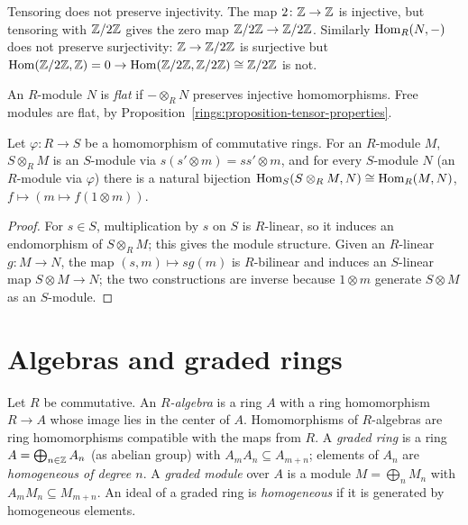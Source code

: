\begin{counterexample}\label{rings:counterexample-tensor-not-left-exact}
Tensoring does not preserve injectivity. The map $2 \colon \mathbb{Z} \to \mathbb{Z}$ is injective, but
tensoring with $\mathbb{Z}/2\mathbb{Z}$ gives the zero map $\mathbb{Z}/2\mathbb{Z} \to \mathbb{Z}/2\mathbb{Z}$. Similarly
$\operatorname{Hom}_R(N, -)$ does not preserve surjectivity: $\mathbb{Z} \to \mathbb{Z}/2\mathbb{Z}$ is surjective but
$\operatorname{Hom}(\mathbb{Z}/2\mathbb{Z}, \mathbb{Z}) = 0 \to \operatorname{Hom}(\mathbb{Z}/2\mathbb{Z}, \mathbb{Z}/2\mathbb{Z}) \cong \mathbb{Z}/2\mathbb{Z}$ is not.
\end{counterexample}

\begin{definition}\label{rings:definition-flat}
An $R$-module $N$ is \emph{flat} if $- \otimes_R N$ preserves injective homomorphisms.
Free modules are flat, by Proposition~\ref{rings:proposition-tensor-properties}.
\end{definition}

\begin{proposition}\label{rings:proposition-extension-scalars}
Let $\varphi \colon R \to S$ be a homomorphism of commutative rings. For an $R$-module $M$,
$S \otimes_R M$ is an $S$-module via $s(s' \otimes m) = ss' \otimes m$, and for every $S$-module $N$
(an $R$-module via $\varphi$) there is a natural bijection
$\operatorname{Hom}_S(S \otimes_R M, N) \cong \operatorname{Hom}_R(M, N)$, $f \mapsto (m \mapsto f(1 \otimes m))$.
\end{proposition}

\begin{proof}
For $s \in S$, multiplication by $s$ on $S$ is $R$-linear, so it induces an endomorphism of
$S \otimes_R M$; this gives the module structure. Given an $R$-linear $g \colon M \to N$, the map
$(s, m) \mapsto sg(m)$ is $R$-bilinear and induces an $S$-linear map $S \otimes M \to N$; the two
constructions are inverse because $1 \otimes m$ generate $S \otimes M$ as an $S$-module.
\end{proof}

\section{Algebras and graded rings}\label{rings:section-algebras}

\begin{definition}\label{rings:definition-algebra}
Let $R$ be commutative. An \emph{$R$-algebra} is a ring $A$ with a ring homomorphism
$R \to A$ whose image lies in the center of $A$. Homomorphisms of $R$-algebras are ring
homomorphisms compatible with the maps from $R$. A \emph{graded ring} is a ring
$A = \bigoplus_{n \in \mathbb{Z}} A_n$ (as abelian group) with $A_m A_n \subseteq A_{m+n}$; elements of $A_n$ are
\emph{homogeneous of degree $n$}. A \emph{graded module} over $A$ is a module
$M = \bigoplus_n M_n$ with $A_m M_n \subseteq M_{m+n}$. An ideal of a graded ring is \emph{homogeneous} if
it is generated by homogeneous elements.
\end{definition}

